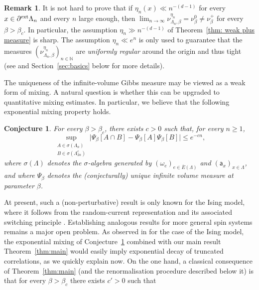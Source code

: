 \documentclass[11pt,a4paper]{article}
\numberwithin{equation}{section}
\theoremstyle{plain}
\newtheorem{Conj}{Conjecture}
\theoremstyle{definition}
\newtheorem{Rem}[Thm]{Remark}
\begin{document}
\begin{Rem}\label{rem: weak plus measure}
	It is not hard to prove that if $ \eta_n(x) \ll n^{-(d-1)}$ for every $x\in \partial
    ^{\textup{ext}}\Lambda_n$ and every $n$ large enough, then $\lim_{n\to\infty} \nu^{\eta_n}_{\Lambda_n,\beta}= \nu_\beta^0 \neq \nu^+_{\beta}$ for every $\beta>\beta_c$. In particular, the assumption $\eta_n \gg n^{-(d-1)}$ of Theorem~\ref{thm: weak plus measure} is sharp. The assumption $\eta_n\ll e^n$ is only used to guarantee that the measures $(\nu^{\eta_n}_{\Lambda_n,\beta})_{n\in\mathbb N}$ are \emph{uniformly regular} around the origin and thus tight (see \cite{PV26} and Section~\ref{sec:basics} below for more details).
\end{Rem}



The uniqueness of the infinite-volume Gibbs measure may be viewed as a weak form of mixing.
A natural question is whether this can be upgraded to quantitative mixing estimates. In particular, we believe that the following exponential mixing property holds.
\begin{Conj}\label{conj:exp_mixing}
For every $\beta>\beta_c$, there exists $c>0$ such that, for every $n\geq 1$,
\begin{equation}\label{eq:exp_mixing}
   \sup_{\substack{A\in \sigma(\Lambda_n) \\ B\in \sigma(\Lambda_{2n}^c)}} \big|\Psi_\beta[A\cap B] - \Psi_\beta[A]\Psi_\beta[B]\big| \leq e^{-cn},
\end{equation}
where $\sigma(\Lambda)$ denotes the $\sigma$-algebra generated by $(\omega_e)_{e\in \overline{E}(\Lambda)}$ and $(\mathsf{a}_x)_{x\in\Lambda}$, and where $\Psi_\beta$ denotes the (conjecturally) unique infinite volume measure at parameter $\beta$. 
\end{Conj}
At present, such a (non-perturbative) result is only known for the Ising model, where it follows from the random-current representation and its associated switching principle \cite{DCGR20,GPPS26}. Establishing analogous results for more general spin systems remains a major open problem. 
As observed in \cite{DCGR20} for the case of the Ising model, the exponential mixing of Conjecture~\ref{conj:exp_mixing} combined with our main result Theorem~\ref{thm:main} would easily imply exponential decay of truncated correlations, as we quickly explain now. On the one hand, a classical consequence of Theorem~\ref{thm:main} (and the renormalisation procedure described below it) is that for every $\beta>\beta_c$ there exists $c'>0$ such that
\end{document}
